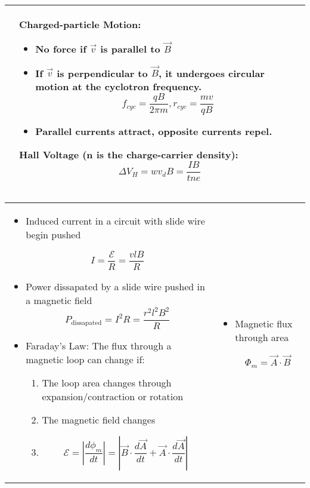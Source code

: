 \documentclass{article}
\begin{document}
\begin{center}
\begin{tabular}{|p{8cm}|p{8cm}|}
		                &

		Charged-particle Motion:
		\begin{itemize}
			\item No force if $\vec{v}$ is parallel to $\vec{B}$
			\item If $\vec{v}$ is perpendicular to $\vec{B}$, it undergoes circular motion at the cyclotron frequency.
			      \[ f_{cyc} = \frac{qB}{2\pi m}, r_{cyc} = \frac{mv}{qB}\]
			\item Parallel currents attract, opposite currents repel.
		\end{itemize}

		Hall Voltage (n is the charge-carrier density):
		\[ \Delta V_H = wv_dB = \frac{IB}{tne}\] \\
		\hline

	\end{tabular}
	\begin{tabular}{|p{8cm}|p{8cm}|}
		\hline

		\begin{itemize}
			\item Induced current in a circuit with slide wire begin pushed

			      \[ I = \frac{\mathcal{E}}{R} = \frac{vlB}{R} \]

			\item Power dissapated by a slide wire pushed in a magnetic field
			      \[ P_\text{dissapated} = I^2 R = \frac{r^2 l^2 B^2}{R} \]
				\item Faraday's Law: The flux through a magnetic loop
			      can change if:

			      \begin{enumerate}
				      \item The loop area changes through expansion/contraction or rotation
				      \item The magnetic field changes
          			  \item \[\mathcal{E} = \left\lvert \frac{d\phi_m}{dt}\right\rvert = \left\lvert \vec{B} \cdot \frac{d\vec{A}}{dt} + \vec{A} \cdot \frac{d\vec{A}}{dt}\right\rvert\]
			      \end{enumerate}
		\end{itemize}


		 &

		\begin{itemize}
			\item Magnetic flux through area

			      \[ \Phi_m = \vec A \cdot \vec B \]


\end{itemize}
\end{tabular}
\end{center}
\end{document}
